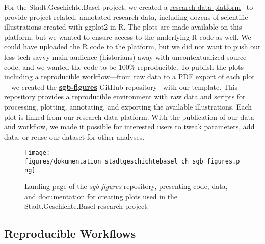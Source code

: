 \documentclass[final]{anthology-ch} %
\begin{document}
For the Stadt.Geschichte.Basel project, we created a \href{https://forschung.stadtgeschichtebasel.ch/}{research data platform}~\cite{goerlich2023} to provide project-related, annotated research data, including dozens of scientific illustrations created with ggplot2 in R. The plots are made available on this platform, but we wanted to ensure access to the underlying R code as well. We could have uploaded the R code to the platform, but we did not want to push our less tech-savvy main audience (historians) away with uncontextualized source code, and we wanted the code to be 100\% reproducible. To publish the plots including a reproducible workflow---from raw data to a PDF export of each plot---we created the \href{https://dokumentation.stadtgeschichtebasel.ch/sgb-figures}{\textbf{sgb-figures}} GitHub repository~\cite{twente2025c} with our template. This repository provides a reproducible environment with raw data and scripts for processing, plotting, annotating, and exporting the available illustrations. Each plot is linked from our research data platform. With the publication of our data and workflow, we made it possible for interested users to tweak parameters, add data, or reuse our dataset for other analyses.

\begin{figure}[t!]
  \centering
  \texttt{[image: figures/dokumentation\_stadtgeschichtebasel\_ch\_sgb\_figures.png]}
  \caption{Landing page of the \emph{sgb-figures} repository, presenting code, data, and documentation for creating plots used in the Stadt.Geschichte.Basel research project.}
  \label{fig-sgb-figures}
\end{figure}

\subsection{Reproducible Workflows}\label{reproducible-workflows}
\end{document}
